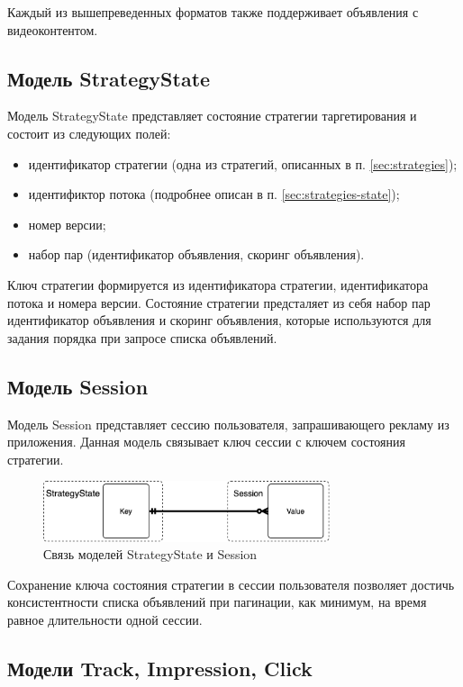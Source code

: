 \documentclass[specification,annotation,times]{itmo-student-thesis}
\begin{document}
Каждый из вышепреведенных форматов также поддерживает объявления с видеоконтентом.

\subsection{Модель StrategyState \label{model:strategy-state}}

Модель StrategyState представляет состояние стратегии таргетирования и состоит из следующих полей:
\begin{itemize}
\item идентификатор стратегии (одна из стратегий, описанных в п. \ref{sec:strategies});
\item идентификтор потока (подробнее описан в п. \ref{sec:strategies-state});
\item номер версии;
\item набор пар (идентификатор объявления, скоринг объявления).
\end{itemize}

Ключ стратегии формируется из идентификатора стратегии, идентификатора потока и номера версии. Состояние стратегии предсталяет из себя набор пар идентификатор объявления и скоринг объявления, которые используются для задания порядка при запросе списка объявлений.

\subsection{Модель Session\label{model:session}}

Модель Session представляет сессию пользователя, запрашивающего рекламу из приложения. Данная модель связывает ключ сессии с ключем состояния стратегии.

\begin{figure}[h]
\caption{Связь моделей StrategyState и Session}
\includegraphics[width=0.75\textwidth]{strategy-state-session}
\centering
\end{figure}
Сохранение ключа состояния стратегии в сессии пользователя позволяет достичь консистентности списка объявлений при пагинации, как минимум, на время равное длительности одной сессии.

\subsection{Модели Track, Impression, Click}
\end{document}
